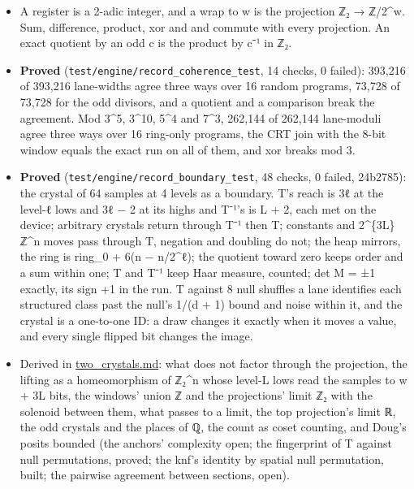 \begin{itemize}
\begin{itemize}
\item A register is a 2-adic integer, and a wrap to w is the projection ℤ₂ → ℤ/2\textasciicircum{}w. Sum, difference, product, xor and and commute with every projection. An exact quotient by an odd c is the product by c⁻¹ in ℤ₂.
\item \textbf{Proved} (\texttt{test/\allowbreak{}engine/\allowbreak{}record\_\allowbreak{}coherence\_\allowbreak{}test}, 14 checks, 0 failed): 393,216 of 393,216 lane-widths agree three ways over 16 random programs, 73,728 of 73,728 for the odd divisors, and a quotient and a comparison break the agreement. Mod 3\textasciicircum{}5, 3\textasciicircum{}10, 5\textasciicircum{}4 and 7\textasciicircum{}3, 262,144 of 262,144 lane-moduli agree three ways over 16 ring-only programs, the CRT join with the 8-bit window equals the exact run on all of them, and xor breaks mod 3.
\item \textbf{Proved} (\texttt{test/\allowbreak{}engine/\allowbreak{}record\_\allowbreak{}boundary\_\allowbreak{}test}, 48 checks, 0 failed, 24b2785): the crystal of 64 samples at 4 levels as a boundary. T's reach is 3ℓ at the level-ℓ lows and 3ℓ − 2 at its highs and T⁻¹'s is L + 2, each met on the device; arbitrary crystals return through T⁻¹ then T; constants and 2\textasciicircum{}\{3L\}ℤ\textasciicircum{}n moves pass through T, negation and doubling do not; the heap mirrors, the ring is ring\_\allowbreak{}0 + 6(n − n/2\textasciicircum{}ℓ); the quotient toward zero keeps order and a sum within one; T and T⁻¹ keep Haar measure, counted; det M = ±1 exactly, its sign +1 in the run. T against 8 null shuffles a lane identifies each structured class past the null's 1/(d + 1) bound and noise within it, and the crystal is a one-to-one ID: a draw changes it exactly when it moves a value, and every single flipped bit changes the image.
\item Derived in \hyperref[chap:two-crystals]{two\_\allowbreak{}crystals.md}: what does not factor through the projection, the lifting as a homeomorphism of ℤ₂\textasciicircum{}n whose level-L lows read the samples to w + 3L bits, the windows' union ℤ and the projections' limit ℤ₂ with the solenoid between them, what passes to a limit, the top projection's limit ℝ, the odd crystals and the places of ℚ, the count as coset counting, and Doug's posits bounded (the anchors' complexity open; the fingerprint of T against null permutations, proved; the knf's identity by spatial null permutation, built; the pairwise agreement between sections, open).

\end{itemize}
\end{itemize}
